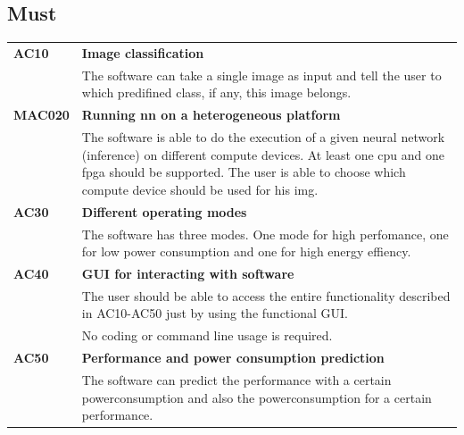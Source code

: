 \documentclass[parskip=full]{scrartcl}
\begin{document}
\subsection{Must}
\begin{tabular}{p{2cm}p{12cm}}
\textbf{AC10} & \textbf{Image classification} \\
& The software can take a single image as input and tell the user to which predifined class, if any, this image belongs.\\
\textbf{MAC020} & \textbf{Running \gls{nn} on a heterogeneous platform} \\
& The software is able to do the execution of a given neural network (inference) on different compute devices. At least one \gls{cpu} and one \gls{fpga} should be supported.
The user is able to choose which compute device should be used for his \gls{img}.\\
\textbf{AC30} & \textbf{Different operating modes} \\
& The software has three modes. One mode for high perfomance, one for low power consumption and one for high energy effiency. \\
\textbf{AC40} & \textbf{GUI for interacting with software} \\
& The user should be able to access the entire functionality described in AC10-AC50 just by using the functional GUI.\\ 
& No coding or command line usage is required.\\
\textbf{AC50} & \textbf{Performance and power consumption prediction}\\
& The software can predict the performance with a certain powerconsumption and also the powerconsumption for a certain performance.

\end{tabular}
\end{document}
